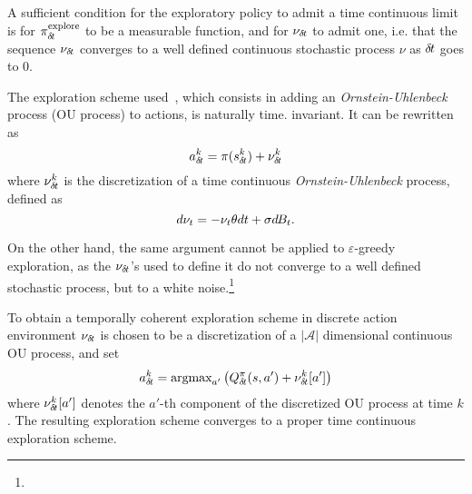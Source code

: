A sufficient condition for the exploratory policy to admit a time continuous
limit is for $\pi^\text{explore}_{\delta\hspace{-.1em}t}$ to be a measurable function, and for
$\nu_{\delta\hspace{-.1em}t}$ to admit one, i.e. that the sequence $\nu_{\delta\hspace{-.1em}t}$ converges to a
well defined continuous stochastic process $\nu$ as ${\delta\hspace{-.1em}t}$ goes to $0$.

The exploration scheme used~\cite{ddpg}, which consists in adding an
\emph{Ornstein-Uhlenbeck}~\cite{orn-uhl} process (OU process) to actions, is naturally time.
invariant. It can be rewritten as
\begin{equation}
	a^k_{\delta\hspace{-.1em}t} = \pi(s^k_{\delta\hspace{-.1em}t}) + \nu^k_{\delta\hspace{-.1em}t}
\end{equation}
where $\nu^k_{\delta\hspace{-.1em}t}$ is the discretization of a time continuous \emph{Ornstein-Uhlenbeck}
process, defined as
\begin{equation}
	d\nu_t = - \nu_t \theta dt + \sigma d\hspace{-.1em}B_t.
	\label{eq:orn_uhl}
\end{equation}

On the other hand, the same argument cannot be applied to $\varepsilon$-greedy
exploration, as the $\nu_{\delta\hspace{-.1em}t}$'s used to define it do not converge to a 
well defined stochastic process, but to a white noise.\footnote{}

To obtain a temporally coherent exploration scheme in discrete action environment
$\nu_{\delta\hspace{-.1em}t}$ is chosen to be a discretization of a $|\mathcal{A}|$ dimensional
continuous OU process, and set
\begin{equation}
	a^k_{\delta\hspace{-.1em}t} = \text{argmax}_{a'} \left(Q^\pi_{\delta\hspace{-.1em}t}(s, a') + \nu_{\delta\hspace{-.1em}t}^k[a']\right)
\end{equation}
where $\nu_{\delta\hspace{-.1em}t}^k[a']$ denotes the $a'$-th component of the discretized OU process at time
$k$. The resulting exploration scheme converges to a proper time continuous exploration scheme.

